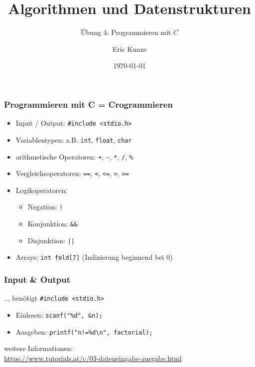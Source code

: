 \documentclass{beamer}
\begin{document}
	
	\title{Algorithmen und Datenstrukturen}
	\subtitle{Übung 4: Programmieren mit $C$}
	\author{Eric Kunze}
	\date{\today}

	\maketitle



\begin{frame}[fragile] \frametitle{Programmieren mit C = Crogrammieren}
	\begin{itemize}
		\item Input / Output: \lstinline{#include <stdio.h>}
		\item Variablentypen: z.B. \lstinline{int}, \lstinline{float}, \lstinline{char}
		\item arithmetische Operatoren: \lstinline{+}, \lstinline{-},  \lstinline{*}, \lstinline{/}, \lstinline{%}
		\item Vergleichsoperatoren: \lstinline{==}, \lstinline{<}, \lstinline{<=}, \lstinline{>}, \lstinline{>=}
		\item Logikoperatoren: 
		\begin{itemize}
			\item Negation: \lstinline{!} 
			\item Konjunktion: \lstinline{&&} 
			\item Disjunktion: \lstinline{||}
		\end{itemize}
		\item Arrays: \lstinline{int feld[7]} (Indizierung beginnend bei 0)
	\end{itemize}
\end{frame}

\begin{frame}[fragile] \frametitle{Input \& Output}
	... benötigt \lstinline|#include <stdio.h>|
	\begin{itemize}
		\item Einlesen: \lstinline{scanf("%d", &n);}
		\item Ausgeben: \lstinline{printf("n!=%d\n", factorial);}
	\end{itemize}

	weitere Informationen: \\
	\url{https://www.tutorials.at/c/03-dateneingabe-ausgabe.html}
			
			
\end{frame}
\end{document}
